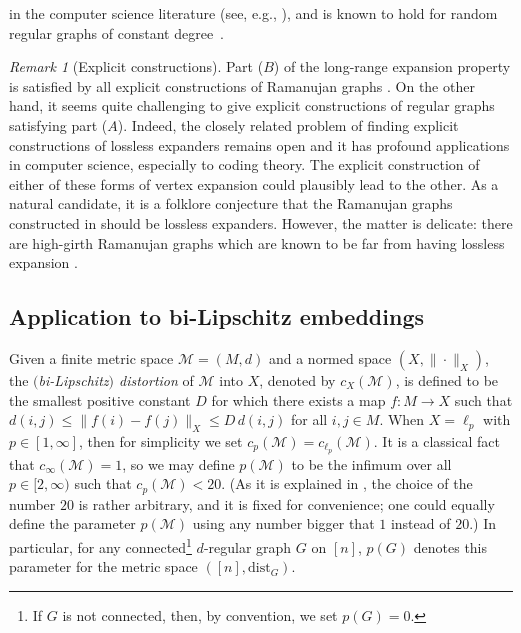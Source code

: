 \documentclass[11pt,leqno]{amsart}
\theoremstyle{remark}
\newtheorem{remark}[theorem]{Remark}
\theoremstyle{plain}
\begin{document}
in the computer science literature (see, e.g., \cite{Ka95,CRVW02}), and is known to hold for random regular graphs
of constant degree~\cite{Vad12}.
\begin{remark}[Explicit constructions] \label{rem-explicit-constructions}
Part (\hyperref[Part-B]{$B$}) of the long-range expansion property is satisfied by all explicit constructions
of Ramanujan graphs \cite{LPS88}. On the other hand, it seems quite challenging to give explicit constructions
of regular graphs satisfying part (\hyperref[Part-A]{$A$}). Indeed, the closely related problem of finding explicit
constructions of lossless expanders remains open and it has profound applications in computer science,
especially to coding theory. The explicit construction of either of these forms of vertex expansion could plausibly
lead to the other. As a natural candidate, it is a folklore conjecture that the Ramanujan graphs constructed
in \cite{LPS88} should be lossless expanders. However, the matter is delicate: there are high-girth Ramanujan graphs
which are known to be far from having lossless expansion \cite{MS21}.
\end{remark}


\subsection{Application to bi-Lipschitz embeddings}

Given a finite metric space $\mathcal{M}=(M,d)$ and a normed space $(X,\|\cdot\|_X)$, the \emph{$($bi-Lipschitz$)$ distortion}
of $\mathcal{M}$ into $X$, denoted by $c_X(\mathcal{M})$, is defined to be the smallest positive constant $D$ for which
there exists  a map $f\colon M\to X$ such that $d(i,j)\leqslant \|f(i)-f(j)\|_X\leqslant D\, d(i,j)$ for all $i,j\in M$.
When $X=\ell_p$ with $p\in [1,\infty]$, then for simplicity we set $c_p(\mathcal{M})= c_{\ell_p}(\mathcal{M})$.
It is a classical fact that $c_{\infty}(\mathcal{M})=1$, so we may define $p(\mathcal{M})$ to be the infimum over all
$p\in [2,\infty)$ such that $c_p(\mathcal{M})<20$. (As it is explained in \cite{Na14}, the choice of the number $20$
is rather arbitrary, and it is fixed for convenience; one could equally define the parameter $p(\mathcal{M})$
using any number bigger that $1$ instead of $20$.) In particular, for any connected\footnote{If $G$ is not connected,
then, by convention, we set $p(G)=0$.} $d$-regular graph $G$ on $[n]$, $p(G)$ denotes this parameter for the metric space $([n],\mathrm{dist}_G)$.
\end{document}

